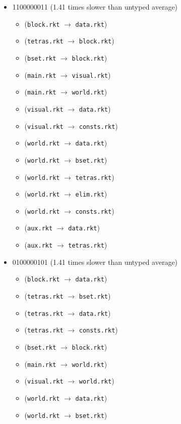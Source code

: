 \documentclass{article}
\newcommand{\mono}[1]{\texttt{#1}}
\begin{document}
\begin{itemize}
\item 1100000011 (1.41 times slower than untyped average)
  \begin{itemize}
  \item (\mono{block.rkt} $\rightarrow$ \mono{data.rkt})
  \item (\mono{tetras.rkt} $\rightarrow$ \mono{block.rkt})
  \item (\mono{bset.rkt} $\rightarrow$ \mono{block.rkt})
  \item (\mono{main.rkt} $\rightarrow$ \mono{visual.rkt})
  \item (\mono{main.rkt} $\rightarrow$ \mono{world.rkt})
  \item (\mono{visual.rkt} $\rightarrow$ \mono{data.rkt})
  \item (\mono{visual.rkt} $\rightarrow$ \mono{consts.rkt})
  \item (\mono{world.rkt} $\rightarrow$ \mono{data.rkt})
  \item (\mono{world.rkt} $\rightarrow$ \mono{bset.rkt})
  \item (\mono{world.rkt} $\rightarrow$ \mono{tetras.rkt})
  \item (\mono{world.rkt} $\rightarrow$ \mono{elim.rkt})
  \item (\mono{world.rkt} $\rightarrow$ \mono{consts.rkt})
  \item (\mono{aux.rkt} $\rightarrow$ \mono{data.rkt})
  \item (\mono{aux.rkt} $\rightarrow$ \mono{tetras.rkt})
  \end{itemize}
\item 0100000101 (1.41 times slower than untyped average)
  \begin{itemize}
  \item (\mono{block.rkt} $\rightarrow$ \mono{data.rkt})
  \item (\mono{tetras.rkt} $\rightarrow$ \mono{bset.rkt})
  \item (\mono{tetras.rkt} $\rightarrow$ \mono{data.rkt})
  \item (\mono{tetras.rkt} $\rightarrow$ \mono{consts.rkt})
  \item (\mono{bset.rkt} $\rightarrow$ \mono{block.rkt})
  \item (\mono{main.rkt} $\rightarrow$ \mono{world.rkt})
  \item (\mono{visual.rkt} $\rightarrow$ \mono{world.rkt})
  \item (\mono{world.rkt} $\rightarrow$ \mono{data.rkt})
  \item (\mono{world.rkt} $\rightarrow$ \mono{bset.rkt})

\end{itemize}
\end{itemize}
\end{document}
